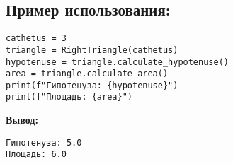 \begin{enumerate}
\subsection*{Пример использования:}
\begin{verbatim}
cathetus = 3
triangle = RightTriangle(cathetus)
hypotenuse = triangle.calculate_hypotenuse()
area = triangle.calculate_area()
print(f"Гипотенуза: {hypotenuse}")
print(f"Площадь: {area}")
\end{verbatim}

\textbf{Вывод:}
\begin{verbatim}
Гипотенуза: 5.0
Площадь: 6.0
\end{verbatim}

\end{enumerate}
